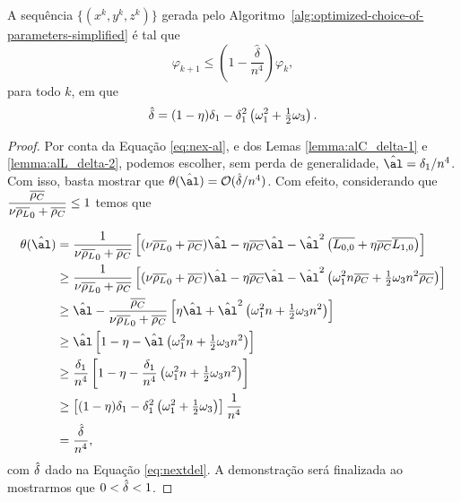 \begin{lema}\label{lemma:next-phi-delta-n4}
A sequência $\{(x^{k},y^{k},z^{k})\}$ gerada pelo Algoritmo~\ref{alg:optimized-choice-of-parameters-simplified} é tal que
\begin{equation}
		\label{eq:varphi-delta-n4}
				\varphi_{k+1}\leq \left(1 - \frac{\hat{\delta}}{n^{4}}\right)\varphi_{k},
	\end{equation}
	para todo $k$, em que 
	\begin{equation}
		\label{eq:nextdel}
		 \hat{\delta} =(1 -  \eta)\delta_{1} - \delta_{1}^{2}\left(\omega_1^{2} + \tfrac{1}{2}\omega_{3} \right).
	\end{equation}
\end{lema}


\begin{proof} Por conta da Equação \eqref{eq:nex-al}, e dos Lemas \ref{lemma:alC_delta-1} e \ref{lemma:alL_delta-2}, podemos escolher, sem perda de generalidade, $\nextal = \delta_{1}/n^{4}$. Com isso, basta mostrar que $\theta(\nextal)= \Oset(\nextdel/n^{4})$. Com efeito, considerando que $\dfrac{\overline{\rho_C}}{\nu\overline{\rho_L}_0 + \overline{\rho_C}}\leq 1$ temos que


\[
	\begin{aligned}
		\theta(\nextal)%
						& = \dfrac{1}{\nu\dbvec{\rho_L}_0 + \dbvec{\rho_C}}\left[ (\nu\dbvec{\rho_L}_0 + \dbvec{\rho_C})\nextal -  \eta\dbvec{\rho_C}\nextal - \nextal^{2}\left(\dbvec{L_{0,0}} + \eta\dbvec{\rho_C} \dbvec{L_{1,0}} \right) \right] \\
						& \geq \dfrac{1}{\nu\dbvec{\rho_L}_0 + \dbvec{\rho_C}}\left[ (\nu\dbvec{\rho_L}_0 + \dbvec{\rho_C})\nextal -  \eta\dbvec{\rho_C}\nextal - \nextal^{2}\left(\omega_1^{2} n\dbvec{\rho_C} + \tfrac{1}{2}\omega_{3}n^{2}\dbvec{\rho_C} \right) \right]\\
						& \geq \nextal - \dfrac{\dbvec{\rho_C}}{\nu\dbvec{\rho_L}_0 + \dbvec{\rho_C}} \left[   \eta\nextal + \nextal^{2}\left(\omega_1^{2} n + \tfrac{1}{2}\omega_{3}n^{2} \right) \right]\\
						& \geq \nextal \left[ 1 -  \eta - \nextal\left(\omega_1^{2} n + \tfrac{1}{2}\omega_{3}n^{2} \right) \right] \\
						& \geq \frac{\delta_{1}}{n^{4}} \left[ 1 -  \eta - \frac{\delta_{1}}{n^{4}}\left(\omega_1^{2} n + \tfrac{1}{2}\omega_{3}n^{2} \right) \right] \\
						& \geq 	 \left[ (1 -  \eta)\delta_{1} - \delta_{1}^{2}\left(\omega_1^{2} + \tfrac{1}{2}\omega_{3} \right) \right] \frac{1}{n^{4}}	\\
						& = \frac{\nextdel}{n^{4}},		
		\end{aligned}
	\]
	com 	$\hat{\delta}$ dado na Equação \eqref{eq:nextdel}. A demonstração será finalizada ao mostrarmos que $0<\hat{\delta}<1$.


\end{proof}
